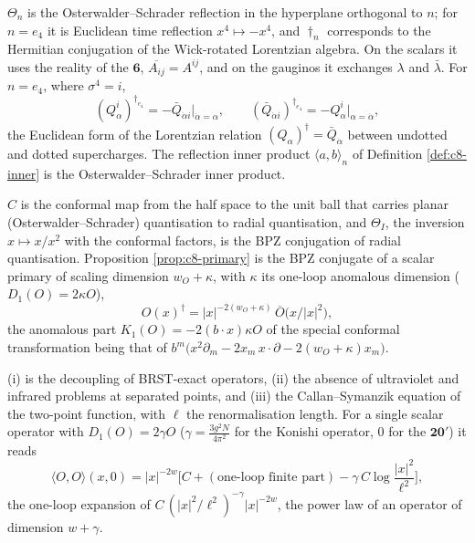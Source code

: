 \begin{remark}
$\Theta_n$ is the Osterwalder--Schrader reflection in the hyperplane orthogonal to $n$; for $n=e_4$ it is Euclidean time reflection $x^4\mapsto-x^4$, and $\dagger_n$ corresponds to the Hermitian conjugation of the Wick-rotated Lorentzian algebra. On the scalars it uses the reality of the $\mathbf6$, $\overline{A_{ij}}=A^{ij}$, and on the gauginos it exchanges $\lambda$ and $\bar\lambda$. For $n=e_4$, where $\sigma^4=i$,
\[
(Q^i_\alpha)^{\dagger_{e_4}}=-\bar Q_{\dot\alpha i}\big|_{\dot\alpha=\alpha},\qquad (\bar Q_{\dot\alpha i})^{\dagger_{e_4}}=-Q^i_\alpha\big|_{\alpha=\dot\alpha},
\]
the Euclidean form of the Lorentzian relation $(Q_\alpha)^\dagger=\bar Q_{\dot\alpha}$ between undotted and dotted supercharges. The reflection inner product $\langle a,b\rangle_n$ of Definition \ref{def:c8-inner} is the Osterwalder--Schrader inner product.
\end{remark}

\begin{remark}
$C$ is the conformal map from the half space to the unit ball that carries planar (Osterwalder--Schrader) quantisation to radial quantisation, and $\Theta_I$, the inversion $x\mapsto x/x^2$ with the conformal factors, is the BPZ conjugation of radial quantisation. Proposition \ref{prop:c8-primary} is the BPZ conjugate of a scalar primary of scaling dimension $w_O+\kappa$, with $\kappa$ its one-loop anomalous dimension ($D_1(O)=2\kappa O$),
\[
O(x)^\dagger=|x|^{-2(w_O+\kappa)}\,\overline O\big(x/|x|^2\big),
\]
the anomalous part $K_1(O)=-2(b\cdot x)\kappa O$ of the special conformal transformation being that of $b^m\big(x^2\partial_m-2x_m\,x\cdot\partial-2(w_O+\kappa)x_m\big)$.
\end{remark}

\begin{remark}
(i) is the decoupling of BRST-exact operators, (ii) the absence of ultraviolet and infrared problems at separated points, and (iii) the Callan--Symanzik equation of the two-point function, with $\ell$ the renormalisation length. For a single scalar operator with $D_1(O)=2\gamma O$ ($\gamma=\frac{3g^2N}{4\pi^2}$ for the Konishi operator, $0$ for the $\mathbf{20'}$) it reads
\[
\langle O,O\rangle(x,0)=|x|^{-2w}\Big[C+(\text{one-loop finite part})-\gamma\,C\log\frac{|x|^2}{\ell^2}\Big],
\]
the one-loop expansion of $C\,(|x|^2/\ell^2)^{-\gamma}|x|^{-2w}$, the power law of an operator of dimension $w+\gamma$.
\end{remark}

